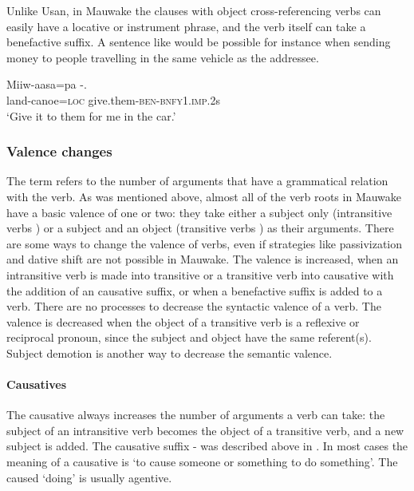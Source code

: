 Unlike Usan, in Mauwake the clauses with object cross-referencing verbs can easily have a locative or instrument phrase, and the verb itself can take a benefactive suffix. A sentence like  would be possible for instance when sending money to people travelling in the same vehicle as the addressee. 

\ea%
\label{ex:3:x338}
\gll Miiw-aasa=pa -. \\
land-canoe=\textsc{loc} give.them-\textsc{ben}-\textsc{bnfy}1.\textsc{imp}.2s \\
\glt`Give it to them for me in the car.'
\z

\subsubsection{Valence changes}\label{sec:3.8.4.3}
{}
The term  refers to the number of arguments that have a grammatical relation with the verb. As was mentioned above, almost all of the verb roots in Mauwake have a basic valence of one or two: they take either a subject only (intransitive verbs ) or a subject and an object (transitive verbs ) as their arguments. There are some ways to change the valence of verbs, even if strategies like passivization and dative shift are not possible in Mauwake. The valence is increased, when an intransitive verb is made into transitive or a transitive verb into causative with the addition of an causative suffix, or when a benefactive suffix is added to a verb. There are no processes to decrease the syntactic valence of a verb. The  valence is decreased when the object of a transitive verb is a reflexive or reciprocal pronoun, since the subject and object have the same referent(s). Subject demotion is another way to decrease the semantic valence. 

\paragraph{Causatives}\label{sec:3.8.4.3.1}
{}
The causative always increases the number of arguments a verb can take: the subject of an intransitive verb becomes the object of a transitive verb, and a new subject is added. The causative suffix - was described above in . In most cases the meaning of a causative is `to cause someone or something to do something'. The caused `doing' is usually agentive. 


